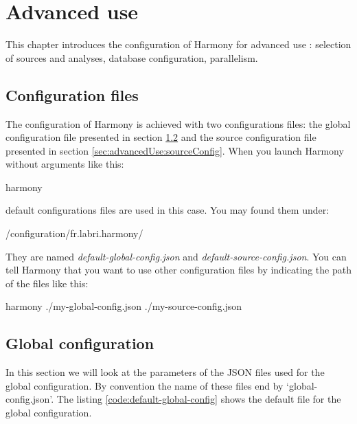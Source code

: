 \chapter{Advanced use}\label{chap:AdvancedUse}

This chapter introduces the configuration of Harmony for advanced use : selection of sources and analyses, database configuration, parallelism.

	\section{Configuration files}
The configuration of Harmony is achieved with two configurations files: the global configuration file presented in section \ref{sec:advancedUse:globalConfig} and the source configuration file presented in section \ref{sec:advancedUse:sourceConfig}. When you launch Harmony without arguments like this:	

\begin{unixcom}
  harmony
\end{unixcom}

default configurations files are used in this case. You may found them under:
\begin{unixcom}
	 /configuration/fr.labri.harmony/  
\end{unixcom}
They are named \emph{default-global-config.json} and \emph{default-source-config.json}. You can tell Harmony that you want to use other configuration files by indicating the path of the files like this:

\begin{unixcom}
  harmony ./my-global-config.json ./my-source-config.json
\end{unixcom}

	\section{Global configuration}\label{sec:advancedUse:globalConfig}
In this section we will look at the parameters of the JSON files used for the global configuration. By convention the name of these files end by `global-config.json'. The listing \ref{code:default-global-config} shows the default file for the global configuration.



